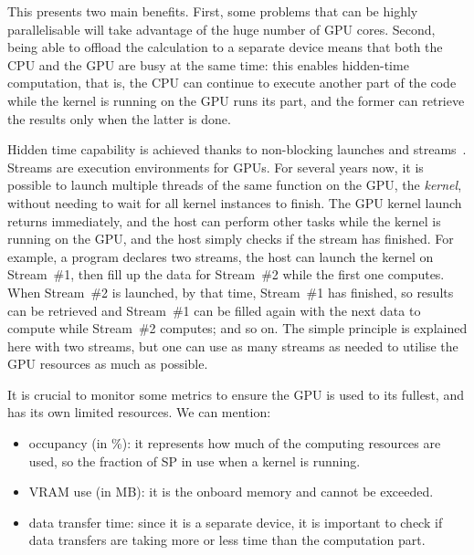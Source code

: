 
This presents two main benefits. First, some problems that can be highly parallelisable will take advantage of the huge number of GPU cores. Second, being able to offload the calculation to a separate device means that both the CPU and the GPU are busy at the same time: this enables hidden-time computation, that is, the CPU can continue to execute another part of the code while the kernel is running on the GPU runs its part, and the former can retrieve the results only when the latter is done.

Hidden time capability is achieved thanks to non-blocking launches and streams~\cite{misc:cudastreams}. Streams are execution environments for GPUs. For several years now, it is possible to launch multiple threads of the same function on the GPU, the \emph{kernel}, without needing to wait for all kernel instances to finish. The GPU kernel launch returns immediately, and the host can perform other tasks while the kernel is running on the GPU, and the host simply checks if the stream has finished. For example, a program declares two streams, the host can launch the kernel on Stream~\#1, then fill up the data for Stream~\#2 while the first one computes. When Stream~\#2 is launched, by that time, Stream~\#1 has finished, so results can be retrieved and Stream~\#1 can be filled again with the next data to compute while Stream~\#2 computes; and so on. The simple principle is explained here with two streams, but one can use as many streams as needed to utilise the GPU resources as much as possible.

It is crucial to monitor some metrics to ensure the GPU is used to its fullest, and has its own limited resources. We can mention:

\begin{itemize}
	\item occupancy (in \%): it represents how much of the computing resources are used, so the fraction of SP in use when a kernel is running.
	\item VRAM use (in MB): it is the onboard memory and cannot be exceeded.
	\item data transfer time: since it is a separate device, it is important to check if data transfers are taking more or less time than the computation part.
\end{itemize}
